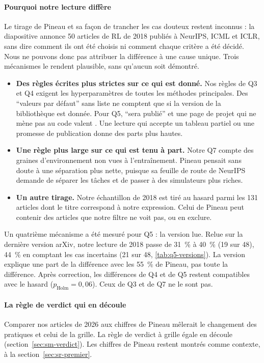 \paragraph{Pourquoi notre lecture diffère}
Le tirage de Pineau et sa façon de trancher les cas douteux restent inconnus : la diapositive annonce
50 articles de RL de 2018 publiés à NeurIPS, ICML et ICLR, sans dire comment ils ont été choisis ni
comment chaque critère a été décidé. Nous ne pouvons donc pas attribuer la différence à une cause unique.
Trois mécanismes le rendent plausible, sans qu'aucun soit démontré.
\begin{itemize}
  \item \textbf{Des règles écrites plus strictes sur ce qui est donné.} Nos règles de Q3 et Q4 exigent
  les hyperparamètres de toutes les méthodes principales. Des \enquote{valeurs par défaut} sans liste
  ne comptent que si la version de la bibliothèque est donnée. Pour Q5, \enquote{sera publié} et une page
  de projet qui ne mène pas au code valent . Une lecture qui accepte un tableau partiel ou une
  promesse de publication donne des parts plus hautes.
  \item \textbf{Une règle plus large sur ce qui est tenu à part.} Notre Q7 compte des graines
  d'environnement non vues à l'entraînement. Pineau pensait sans doute à une séparation plus nette,
  puisque sa feuille de route de NeurIPS demande de séparer les tâches et de passer à des simulateurs
  plus riches.
  \item \textbf{Un autre tirage.} Notre échantillon de 2018 est tiré au hasard parmi les 131 articles
  dont le titre correspond à notre expression. Celui de Pineau peut contenir des articles que notre
  filtre ne voit pas, ou en exclure.
\end{itemize}
Un quatrième mécanisme a été mesuré pour Q5 : la version lue. Relue sur la dernière version arXiv, notre
lecture de 2018 passe de 31~\% à 40~\% (19 sur 48), 44~\% en comptant les cas incertains (21 sur 48,
\cref{tab:q5-versions}). La version explique une part de la différence avec les 55~\% de Pineau, pas toute la différence.
Après correction, les différences de Q4 et de Q5 restent compatibles avec le hasard ($p_{\text{Holm}} =
0{,}06$). Ceux de Q3 et de Q7 ne le sont pas.

\paragraph{La règle de verdict qui en découle}
Comparer nos articles de 2026 aux chiffres de Pineau mêlerait le changement des pratiques et celui de
la grille. La règle de verdict à grille égale en découle (section~\ref{sec:sm-verdict}). Les chiffres de Pineau restent
montrés comme contexte, à la section~\ref{sec:sr-premier}.


